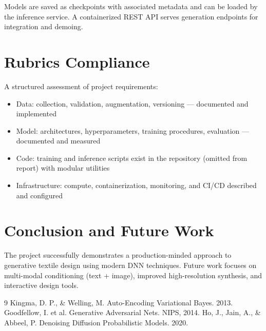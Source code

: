 \documentclass[12pt,a4paper]{report}
\begin{document}
Models are saved as checkpoints with associated metadata and can be loaded by the inference service. A containerized REST API serves generation endpoints for integration and demoing.

\chapter{Rubrics Compliance}

A structured assessment of project requirements:
\begin{itemize}
  \item Data: collection, validation, augmentation, versioning — documented and implemented
  \item Model: architectures, hyperparameters, training procedures, evaluation — documented and measured
  \item Code: training and inference scripts exist in the repository (omitted from report) with modular utilities
  \item Infrastructure: compute, containerization, monitoring, and CI/CD described and configured
\end{itemize}

\chapter{Conclusion and Future Work}

The project successfully demonstrates a production-minded approach to generative textile design using modern DNN techniques. Future work focuses on multi-modal conditioning (text + image), improved high-resolution synthesis, and interactive design tools.

\newpage

\begin{thebibliography}{9}
 Kingma, D. P., \& Welling, M. Auto-Encoding Variational Bayes. 2013.
 Goodfellow, I. et al. Generative Adversarial Nets. NIPS, 2014.
 Ho, J., Jain, A., \& Abbeel, P. Denoising Diffusion Probabilistic Models. 2020.
\end{thebibliography}
\end{document}
